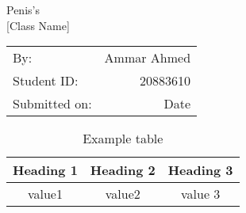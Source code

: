 \documentclass[12pt]{memoir}
\begin{document}
\begin{vplace}[0.7]
\begin{center}
    \LARGE{Penis's}\\[10pt]
    \Large {[Class Name]}\\[10pt]
\end{center}

\begin{center}
    \begin{tabular}{l r}
        By: &  Ammar Ahmed\\
        Student ID: & 20883610 \\
        Submitted on: & Date
    \end{tabular}
\end{center}
\end{vplace}
\newpage

\begin{table}[h!]
    \centering
    \begin{tabular}{||c|c|c||}
    \hline
        \textbf{Heading 1}  & \textbf{Heading 2} & \textbf{Heading 3}  \\
        \hline\hline
         value1 & value2 & value 3\\
         \hline
    \end{tabular}
    \caption{Example table}
    \label{tab:my_label}
\end{table}
\end{document}
